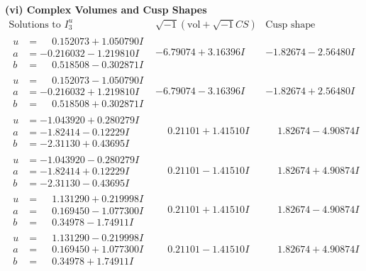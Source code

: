 \documentclass[1p]{elsarticle_modified}
\theoremstyle{definition}
\newcommand{\I}{\sqrt{-1}}
\begin{document}
\newpage\flushleft \textbf{(vi) Complex Volumes and Cusp Shapes}
$$\begin{array}{c|c|c}  
\text{Solutions to }I^u_{3}& \I (\text{vol} + \sqrt{-1}CS) & \text{Cusp shape}\\
 \hline 
\begin{aligned}
u &= \phantom{-}0.152073 + 1.050790 I \\
a &= -0.216032 - 1.219810 I \\
b &= \phantom{-}0.518508 - 0.302871 I\end{aligned}
 & -6.79074 + 3.16396 I & -1.82674 - 2.56480 I \\ \hline\begin{aligned}
u &= \phantom{-}0.152073 - 1.050790 I \\
a &= -0.216032 + 1.219810 I \\
b &= \phantom{-}0.518508 + 0.302871 I\end{aligned}
 & -6.79074 - 3.16396 I & -1.82674 + 2.56480 I \\ \hline\begin{aligned}
u &= -1.043920 + 0.280279 I \\
a &= -1.82414 - 0.12229 I \\
b &= -2.31130 + 0.43695 I\end{aligned}
 & \phantom{-}0.21101 + 1.41510 I & \phantom{-}1.82674 - 4.90874 I \\ \hline\begin{aligned}
u &= -1.043920 - 0.280279 I \\
a &= -1.82414 + 0.12229 I \\
b &= -2.31130 - 0.43695 I\end{aligned}
 & \phantom{-}0.21101 - 1.41510 I & \phantom{-}1.82674 + 4.90874 I \\ \hline\begin{aligned}
u &= \phantom{-}1.131290 + 0.219998 I \\
a &= \phantom{-}0.169450 - 1.077300 I \\
b &= \phantom{-}0.34978 - 1.74911 I\end{aligned}
 & \phantom{-}0.21101 + 1.41510 I & \phantom{-}1.82674 - 4.90874 I \\ \hline\begin{aligned}
u &= \phantom{-}1.131290 - 0.219998 I \\
a &= \phantom{-}0.169450 + 1.077300 I \\
b &= \phantom{-}0.34978 + 1.74911 I\end{aligned}
 & \phantom{-}0.21101 - 1.41510 I & \phantom{-}1.82674 + 4.90874 I \\ \hline\begin{aligned}

\end{aligned}
\end{array}$$
\end{document}
